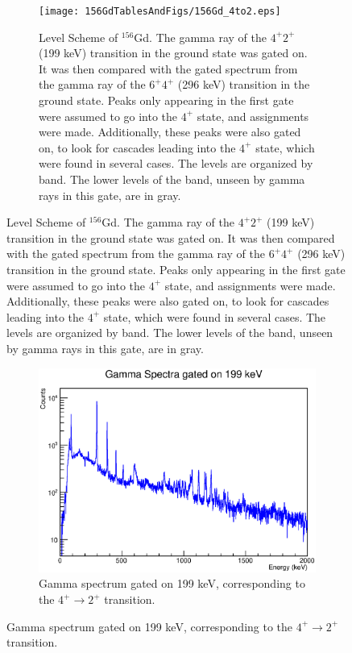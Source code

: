 \begin{landscape}
\begin{figure}[!]
    \centering
    \begin{subfigure}{1.4\textwidth}
    \texttt{[image: 156GdTablesAndFigs/156Gd\_4to2.eps]}
    \caption{\label{fig:156_4to2level}Level Scheme of $^{156}$Gd. The gamma ray of the $4^+$\rightarrow$2^+$ (199 keV) transition in the ground state was gated on. It was then compared with the gated spectrum from the gamma ray of the $6^+$\rightarrow$4^+$ (296 keV) transition in the ground state. Peaks only appearing in the first gate were assumed to go into the $4^+$ state, and assignments were made. Additionally, these peaks were also gated on, to look for cascades leading into the $4^+$ state, which were found in several cases. The levels are organized by band. The lower levels of the band, unseen by gamma rays in this gate, are in gray.}
    \end{subfigure}
    \label{fig:156_4to2}
    \end{figure}
    \begin{figure}
    \ContinuedFloat
    \begin{subfigure}{1.4\textwidth}
    \includegraphics[]{156GdTablesAndFigs/199GateSpectrum.eps}
    \caption{Gamma spectrum gated on 199 keV, corresponding to the $4^+\rightarrow2^+$ transition.}
    \label{fig:156_4to2spec}
    \end{subfigure}
\end{figure}
\end{landscape}